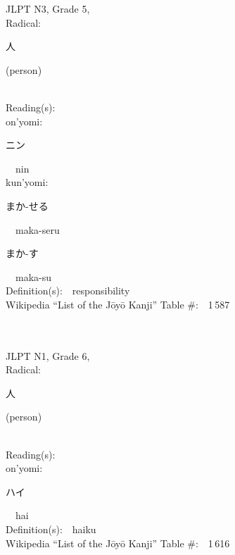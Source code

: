 \begin{multicols}{2}
{JLPT N3, Grade 5, \\Radical:\ \ {\begin{CJK}{UTF8}{min} 人 \end{CJK}} (person) } \\
Reading(s):\ \ \\
{\hspace*{1em}}on'yomi:\ \ \\
{\hspace*{2em}}{\begin{CJK}{UTF8}{min} ニン \end{CJK}}\ \ nin\ \ \\
{\hspace*{1em}}kun'yomi:\ \ \\
{\hspace*{2em}}{\begin{CJK}{UTF8}{min} まか-せる \end{CJK}}\ \ maka-seru\ \ \\
{\hspace*{2em}}{\begin{CJK}{UTF8}{min} まか-す \end{CJK}}\ \ maka-su\ \ \\
Definition(s):\ \ responsibility \\
Wikipedia ``List of the J\=oy\=o Kanji'' Table \#:\ \ 1\,587 \\
\ \ \\
{\fontsize{34pt}{40pt}  }\ \ \\  %
{JLPT N1, Grade 6, \\Radical:\ \ {\begin{CJK}{UTF8}{min} 人 \end{CJK}} (person) } \\
Reading(s):\ \ \\
{\hspace*{1em}}on'yomi:\ \ \\
{\hspace*{2em}}{\begin{CJK}{UTF8}{min} ハイ \end{CJK}}\ \ hai\ \ \\
Definition(s):\ \ haiku \\
Wikipedia ``List of the J\=oy\=o Kanji'' Table \#:\ \ 1\,616 \\
\ \ \\
{\fontsize{34pt}{40pt}  }\ \ \\  %

\end{multicols}
